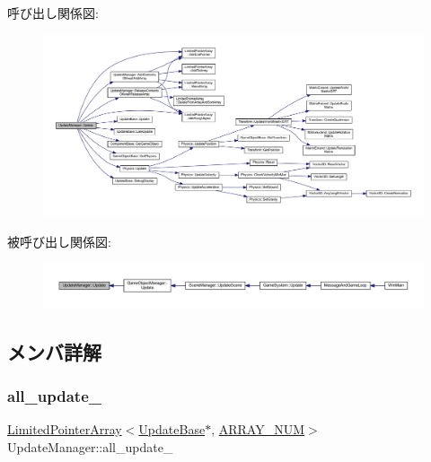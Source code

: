 呼び出し関係図\+:
\nopagebreak
\begin{figure}[H]
\begin{center}
\leavevmode
\includegraphics[width=350pt]{class_update_manager_ac4bdd39d106c7e6b505fe9a0c55e50de_cgraph}
\end{center}
\end{figure}
被呼び出し関係図\+:
\nopagebreak
\begin{figure}[H]
\begin{center}
\leavevmode
\includegraphics[width=350pt]{class_update_manager_ac4bdd39d106c7e6b505fe9a0c55e50de_icgraph}
\end{center}
\end{figure}


\subsection{メンバ詳解}
\mbox{\label{class_update_manager_a1e22347205a91812355ccb0b61538754}} 
\subsubsection{\texorpdfstring{all\+\_\+update\+\_\+}{all\_update\_}}
{\footnotesize\ttfamily \mbox{\hyperlink{class_limited_pointer_array}{Limited\+Pointer\+Array}}$<$\mbox{\hyperlink{class_update_base}{Update\+Base}}$\ast$, \mbox{\hyperlink{class_update_manager_a280b884fb6a025cfd92d4f93086c60c6}{A\+R\+R\+A\+Y\+\_\+\+N\+UM}}$>$ Update\+Manager\+::all\+\_\+update\+\_\+\hspace{0.3cm}{\ttfamily [private]}}



